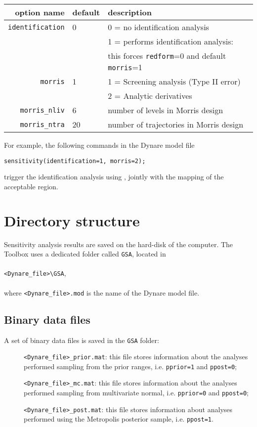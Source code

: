 \documentclass[12pt,a4paper]{article}
\begin{document}
\vspace{1cm}


\begin{tabular}{r|l|l}
                option name & default & description  \\ \hline
       \verb"identification"& 0 & 0 = no identification analysis  \\
                            &   & 1 = performs identification analysis:\\
                            &   & this forces \verb"redform"=0 and default \verb"morris"=1\\
               \verb"morris"& 1 & 1 = Screening analysis (Type II error)\\
                            &   & 2 = Analytic derivatives \citep{Iskrev2010,Iskrev2011}\\
          \verb"morris_nliv"& 6 & number of levels in Morris design\\
          \verb"morris_ntra"& 20& number of trajectories in Morris design\\
\end{tabular}

\vspace{1cm}
\noindent For example, the following commands in the Dynare model file

\vspace{1cm}
\noindent\verb"sensitivity(identification=1, morris=2);"

\vspace{1cm}
\noindent trigger the identification analysis using \cite{Iskrev2010,Iskrev2011}, jointly with the mapping of the acceptable region.


\newpage
\section{Directory structure}
Sensitivity analysis results are saved on the hard-disk of the
computer. The Toolbox uses a dedicated folder called \verb"GSA",
located in \\
\\
\verb"<Dynare_file>\GSA", \\
\\
where \verb"<Dynare_file>.mod" is the name of the Dynare model
file.

\subsection{Binary data files}
A set of binary data files is saved in the \verb"GSA" folder:
\begin{description}
\item[]\verb"<Dynare_file>_prior.mat": this file stores
information about the analyses performed sampling from the prior
ranges, i.e. \verb"pprior=1" and \verb"ppost=0";
\item[]\verb"<Dynare_file>_mc.mat": this file stores
information about the analyses performed sampling from
multivariate normal, i.e. \verb"pprior=0" and \verb"ppost=0";
\item[]\verb"<Dynare_file>_post.mat": this file stores information
about analyses performed using the Metropolis posterior sample,
i.e. \verb"ppost=1".
\end{description}
\end{document}
